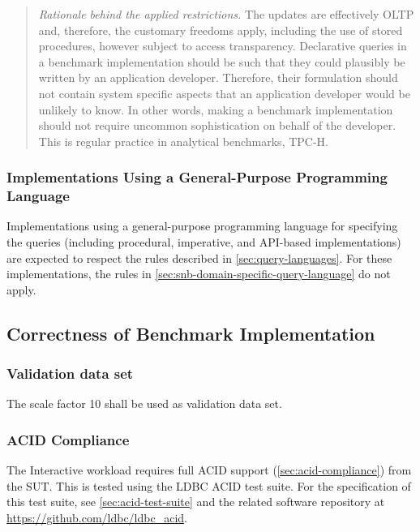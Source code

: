 \begin{quote}
    \emph{Rationale behind the applied restrictions.} The updates are effectively OLTP and, therefore, the customary freedoms apply, including the use of stored procedures, however subject to access transparency. Declarative queries in a benchmark implementation should be such that they could plausibly be written by an application developer. Therefore, their formulation should not contain system specific aspects that an application developer would be unlikely to know. In other words, making a benchmark implementation should not require uncommon sophistication on behalf of the developer. This is regular practice in analytical benchmarks, \eg \mbox{TPC-H}.
\end{quote}

\subsubsection{Implementations Using a General-Purpose Programming Language}
\label{sec:snb-general-purpose-programming-language}

Implementations using a general-purpose programming language for specifying the queries (including procedural, imperative, and API-based implementations) are expected to respect the rules described in \autoref{sec:query-languages}.
For these implementations, the rules in \autoref{sec:snb-domain-specific-query-language} do not apply.

\subsection{Correctness of Benchmark Implementation}

\subsubsection{Validation data set}
\label{sec:int-validation-data-set}
The scale factor 10 shall be used as validation data set.

\subsubsection{ACID Compliance}
\label{sec:int-acid-compliance}

The Interactive workload requires full ACID support (\autoref{sec:acid-compliance}) from the SUT.
This is tested using the LDBC ACID test suite.
For the specification of this test suite, see \autoref{sec:acid-test-suite} and the related software repository at \url{https://github.com/ldbc/ldbc_acid}.

